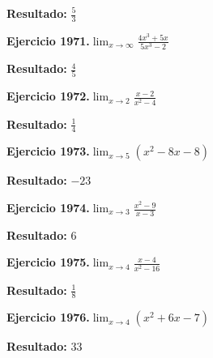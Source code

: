\documentclass[10pt,a4paper]{article}
\begin{document}
\begin{solbox}
\textbf{Resultado:} \(\displaystyle \frac{5}{3}\)
\end{solbox}

\begin{ejbox}
\textbf{Ejercicio 1971.}\quad $\lim_{x\to \infty} \frac{4x^3 + 5x}{5x^3 - 2}$
\end{ejbox}

\begin{solbox}
\textbf{Resultado:} \(\displaystyle \frac{4}{5}\)
\end{solbox}

\newpage
\begin{ejbox}
\textbf{Ejercicio 1972.}\quad $\lim_{x\to 2} \frac{x-2}{x^2-4}$
\end{ejbox}

\begin{solbox}
\textbf{Resultado:} \(\displaystyle \frac{1}{4}\)
\end{solbox}

\begin{ejbox}
\textbf{Ejercicio 1973.}\quad $\lim_{x\to 5} (x^2 -8x -8)$
\end{ejbox}

\begin{solbox}
\textbf{Resultado:} \(\displaystyle -23\)
\end{solbox}

\begin{ejbox}
\textbf{Ejercicio 1974.}\quad $\lim_{x\to 3} \frac{x^2-9}{x-3}$
\end{ejbox}

\begin{solbox}
\textbf{Resultado:} \(\displaystyle 6\)
\end{solbox}

\newpage
\begin{ejbox}
\textbf{Ejercicio 1975.}\quad $\lim_{x\to 4} \frac{x-4}{x^2-16}$
\end{ejbox}

\begin{solbox}
\textbf{Resultado:} \(\displaystyle \frac{1}{8}\)
\end{solbox}

\begin{ejbox}
\textbf{Ejercicio 1976.}\quad $\lim_{x\to 4} (x^2 +6x -7)$
\end{ejbox}

\begin{solbox}
\textbf{Resultado:} \(\displaystyle 33\)
\end{solbox}
\end{document}
